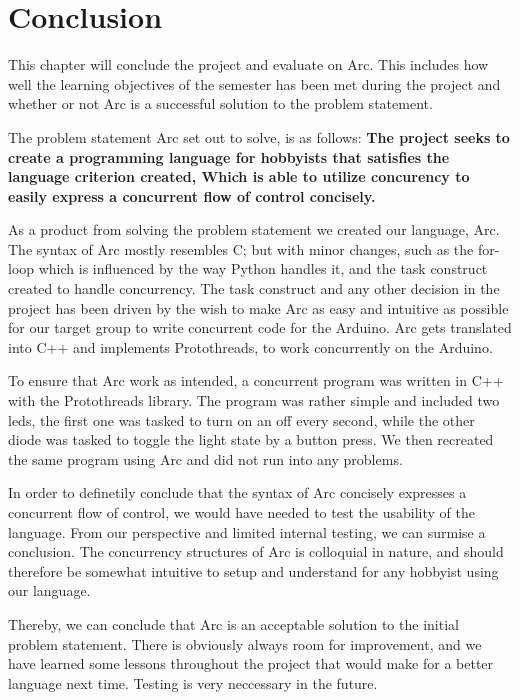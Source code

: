 \chapter{Conclusion}\label{cha:conclusion}

This chapter will conclude the project and evaluate on Arc. This includes how well the learning objectives of the semester has been met during the project and whether or not Arc is a successful solution to the problem statement.




The problem statement Arc set out to solve, is as follows: 
\textbf{The project seeks to create a programming language for hobbyists that satisfies the language criterion created, Which is able to utilize concurency to easily express a concurrent flow of control concisely.}

As a product from solving the problem statement we created our language, Arc. The syntax of Arc mostly resembles C; but with minor changes, such as the for-loop which is influenced by the way Python handles it, and the task construct created to handle concurrency. The task construct and any other decision in the project has been driven by the wish to make Arc as easy and intuitive as possible for our target group to write concurrent code for the Arduino. Arc gets translated into C++ and implements Protothreads, to work concurrently on the Arduino.

To ensure that Arc work as intended, a concurrent program was written in C++ with the Protothreads library. The program was rather simple and included two \gls{led}s, the first one was tasked to turn on an off every second, while the other diode was tasked to toggle the light state by a button press. We then recreated the same program using Arc and did not run into any problems.


In order to definetily conclude that the syntax of Arc concisely expresses a concurrent flow of control, we would have needed to test the usability of the language. From our perspective and limited internal testing, we can surmise a conclusion. The concurrency structures of Arc is colloquial in nature, and should therefore be somewhat intuitive to setup and understand for any hobbyist using our language.

Thereby, we can conclude that Arc is an acceptable solution to the initial problem statement. There is obviously always room for improvement, and we have learned some lessons throughout the project that would make for a better language next time. Testing is very neccessary in the future.